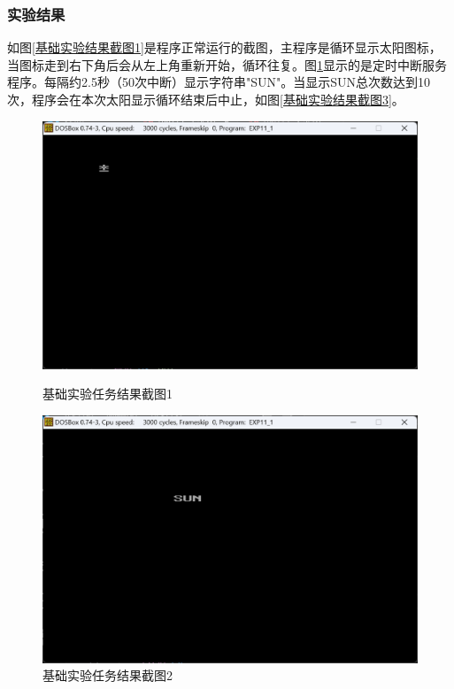 \documentclass[12pt, a4paper, oneside]{ctexart}
\begin{document}
\subsubsection{实验结果}
如图\ref{基础实验结果截图1}是程序正常运行的截图，主程序是循环显示太阳图标，当图标走到右下角后会从左上角重新开始，循环往复。图\ref{基础实验结果截图2}显示的是定时中断服务程序。每隔约2.5秒（50次中断）显示字符串"SUN"。当显示SUN总次数达到10次，程序会在本次太阳显示循环结束后中止，如图\ref{基础实验结果截图3}。
\begin{figure}[H]
    \centering
    \begin{minipage}{0.45\textwidth}
    \centering
    \includegraphics[scale=0.22]{pic/exp11-1-1.png}
    \caption{基础实验任务结果截图1}
    \label{基础实验结果截图1}
    \end{minipage}
    \hspace{0.05\textwidth}
    \begin{minipage}{0.45\textwidth}
    \centering
    \includegraphics[scale=0.22]{pic/exp11-1-2.png}
    \caption{基础实验任务结果截图2}
    \label{基础实验结果截图2}
    \end{minipage}
\end{figure}
\end{document}
